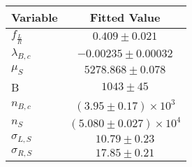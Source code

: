 \begin{tabular}[t]{lc}
\hline
Variable &Fitted Value\\
\hline\hline
$f_{\frac{L}{R}}$&$0.409\pm0.021$\\
\hline
$\lambda_{B,c}$&$-0.00235\pm0.00032$\\
\hline
$\mu_S$&$5278.868\pm0.078$\\
\hline
B&$1043\pm45$\\
\hline
$n_{B,c}$&$(3.95\pm0.17)\times 10^3$\\
\hline
$n_S$&$(5.080\pm0.027)\times 10^4$\\
\hline
$\sigma_{L, S}$&$10.79\pm0.23$\\
\hline
$\sigma_{R, S}$&$17.85\pm0.21$\\
\hline
\end{tabular}